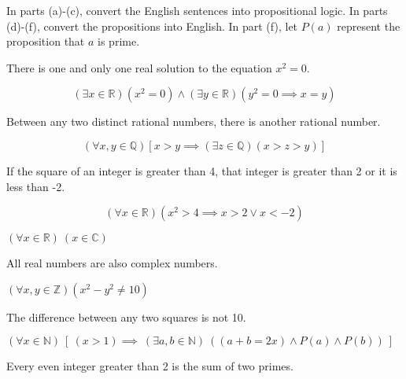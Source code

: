 \documentclass[11pt]{article}
\begin{document}
In parts (a)-(c), convert the English sentences into propositional logic. In parts (d)-(f), convert the propositions into English. In part (f), let $P(a)$ represent the proposition that $a$ is prime.
\begin{Parts}

\Part There is one and only one real solution to the equation $x^2 = 0$.

\begin{solution}
\[(\exists x \in \mathbb R) (x^2 = 0) \land (\exists y \in \mathbb R)(y^2 = 0 \implies x = y)\]

\end{solution}
\Part Between any two distinct rational numbers, there is another rational number.

\begin{solution}    
  \[ (\forall x, y \in \mathbb Q) [x > y \implies (\exists z \in \mathbb Q)(x > z > y)]\]
\end{solution}
\Part If the square of an integer is greater than 4, that integer is greater than 2 or it is less than -2.
\begin{solution}
\[(\forall x \in \mathbb R) (x^2 > 4 \implies x > 2 \lor x < -2)\]
\end{solution}
\Part $(\forall x \in \mathbb{R})\ (x \in \mathbb{C})$

\begin{solution}
  All real numbers are also complex numbers.
\end{solution}
\Part $(\forall x,y \in \mathbb{Z}) (x^2-y^2 \not=10)$


\begin{solution}
  The difference between any two squares is not 10.
\end{solution}
\Part $(\forall x \in \mathbb{N})\ \left[ \ (x > 1) \implies \ (\exists a, b \in \mathbb{N})  \ \left( (a + b = 2x)\land P(a) \land P(b) \right) \ \right]$

\begin{solution}
Every even integer greater than 2 is the sum of two primes.
\end{solution}
\end{Parts}
\end{document}
